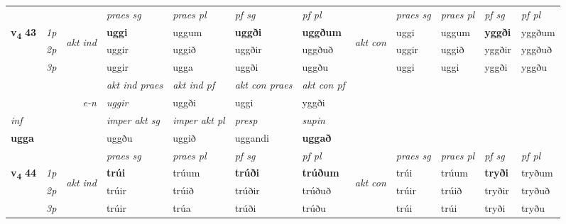 \begin{longtable}[l]{X>{\footnotesize\itshape}llXXXXlXXXX}
 & &   & \textit{praes sg}  & \textit{praes pl}    & \textit{ pf sg} & \textit{pf pl} & & \textit{praes sg}  & \textit{praes pl}    & \textit{pf sg} & \textit{pf pl }  \\ \cmidrule{4-7} \cmidrule{9-12}
 \multirow{2}{*}{{{\textbf{v{\textsubscript{4}}} \Large{\textbf{43}}}}}  & 1p & \multirow{3}{*}{\begin{turn}{90}\textit{akt ind}\end{turn}} & \textbf{uggi} & uggum & \textbf{uggði} & \textbf{uggðum} & \multirow{3}{*}{\begin{turn}{90}\textit{akt con}\end{turn}} &uggi & uggum & \textbf{yggði} & yggðum\\*
 & 2p &  &  uggir  & uggið & uggðir & uggðuð & & uggir & uggið & yggðir & yggðuð \\*
 & 3p &  & uggir & ugga & uggði & uggðu & & uggi & uggi& yggði & yggðu \\*
\cmidrule{4-7} \cmidrule{9-12}

   && &  \textit{akt ind praes} & \textit{akt ind pf} & \textit{akt con praes} & \textit{akt con pf} \\*
\multicolumn{3}{r}{\textit{e-n}} & uggir & uggði & uggi & yggði \\*

\cmidrule{4-7}
   {\textit{inf}} & &  & \textit{imper akt sg} & \textit{imper akt pl}   & \textit{presp} & \textit{supin}   \\*
  {\textbf{ugga}} & && uggðu  & uggið   & uggandi &  \textbf{uggað}   \\*

\midrule

 & &   & \textit{praes sg}  & \textit{praes pl}    & \textit{ pf sg} & \textit{pf pl} & & \textit{praes sg}  & \textit{praes pl}    & \textit{pf sg} & \textit{pf pl }  \\ \cmidrule{4-7} \cmidrule{9-12}
 \multirow{2}{*}{{{\textbf{v{\textsubscript{4}}} \Large{\textbf{44}}}}}  & 1p & \multirow{3}{*}{\begin{turn}{90}\textit{akt ind}\end{turn}} & \textbf{trúi} & trúum & \textbf{trúði} & \textbf{trúðum} & \multirow{3}{*}{\begin{turn}{90}\textit{akt con}\end{turn}} &trúi & trúum & \textbf{tryði} & tryðum\\*
 & 2p &  &  trúir  & trúið & trúðir & trúðuð & & trúir & trúið & tryðir & tryðuð \\*
 & 3p &  & trúir & trúa & trúði & trúðu & & trúi & trúi& tryði & tryðu \\*
\cmidrule{4-7} \cmidrule{9-12}


\end{longtable}
